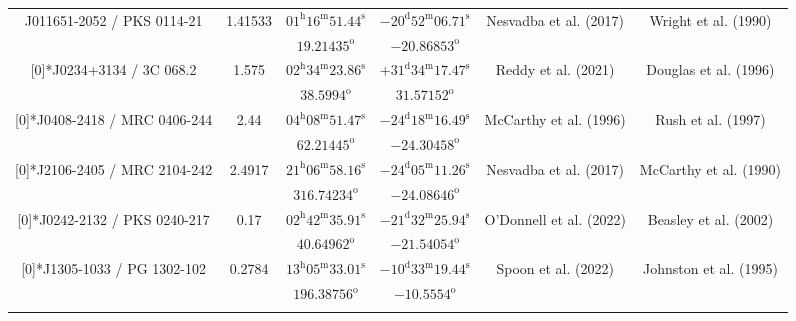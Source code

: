 \begin{landscape}
\begin{longtable}{cccccc}
 \multirow{2}[0]{*}{J011651-2052 / PKS 0114-21} & \multirow{2}[0]{*}{1.41533} &  
    $01^\text{h}16^\text{m}51.44^\text{s}$  & $-20^\text{d}52^\text{m}06.71^\text{s}$  & 
    \multirow{2}[0]{*}{Nesvadba et al. (2017) \cite{RedRef11_2017}}& \multirow{2}[0]{*}{Wright et al. (1990)\cite{CoordRef112_1990}} \\*
    & & $19.21435^\text{o}$ & $-20.86853^\text{o}$ & & \\ \addlinespace 
  \multirow{2}[0]{*}{J0234+3134 / 3C 068.2} & \multirow{2}[0]{*}{1.575} &  
    $02^\text{h}34^\text{m}23.86^\text{s}$  & $+31^\text{d}34^\text{m}17.47^\text{s}$  & 
    \multirow{2}[0]{*}{Reddy et al. (2021) \cite{RedRef113_2021}}& \multirow{2}[0]{*}{Douglas et al. (1996) \cite{CoordRef10_1996}} \\*
    & & $38.5994^\text{o}$ & $31.57152^\text{o}$ & & \\ \addlinespace 
  \multirow{2}[0]{*}{J0408-2418 / MRC 0406-244} & \multirow{2}[0]{*}{2.44} &  
    $04^\text{h}08^\text{m}51.47^\text{s}$  & $-24^\text{d}18^\text{m}16.49^\text{s}$  & 
    \multirow{2}[0]{*}{McCarthy et al. (1996)\cite{RedRef38_1996}}& \multirow{2}[0]{*}{Rush et al. (1997) \cite{CoordRef114_1997}} \\*
    & & $62.21445^\text{o}$ & $-24.30458^\text{o}$ & & \\ \addlinespace 
  \multirow{2}[0]{*}{J2106-2405 / MRC 2104-242} & \multirow{2}[0]{*}{2.4917} &  
    $21^\text{h}06^\text{m}58.16^\text{s}$  & $-24^\text{d}05^\text{m}11.26^\text{s}$  & 
    \multirow{2}[0]{*}{Nesvadba et al. (2017) \cite{RedRef11_2017}}& \multirow{2}[0]{*}{McCarthy et al. (1990)\cite{CoordRef115_1990}} \\*
    & & $316.74234^\text{o}$ & $-24.08646^\text{o}$ & & \\ \addlinespace 
  \multirow{2}[0]{*}{J0242-2132 / PKS 0240-217} & \multirow{2}[0]{*}{0.17} &  
    $02^\text{h}42^\text{m}35.91^\text{s}$  & $-21^\text{d}32^\text{m}25.94^\text{s}$  & 
    \multirow{2}[0]{*}{O'Donnell et al. (2022) \cite{RedRef116_2022}}& \multirow{2}[0]{*}{Beasley et al. (2002) \cite{CoordRef4_2002}} \\*
    & & $40.64962^\text{o}$ & $-21.54054^\text{o}$ & & \\ \addlinespace 

  \multirow{2}[0]{*}{J1305-1033 / PG 1302-102} & \multirow{2}[0]{*}{0.2784} &  
    $13^\text{h}05^\text{m}33.01^\text{s}$  & $-10^\text{d}33^\text{m}19.44^\text{s}$  & 
    \multirow{2}[0]{*}{Spoon et al. (2022) \cite{RedRef14_2022}}& \multirow{2}[0]{*}{Johnston et al. (1995)\cite{CoordRef0_1995}} \\*
    & & $196.38756^\text{o}$ & $-10.5554^\text{o}$ & & \\ \addlinespace 


\end{longtable}
\end{landscape}

